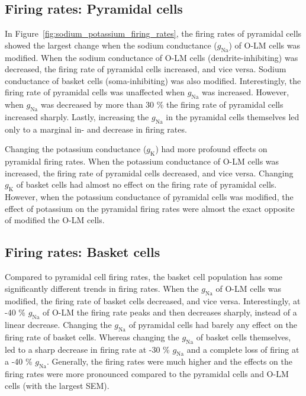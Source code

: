 \subsection{Firing rates: Pyramidal cells}
In Figure~\ref{fig:sodium_potassium_firing_rates}, the firing rates of pyramidal cells showed the largest change when the sodium conductance (\(g_{\text{Na}}\)) of O-LM cells was modified.
When the sodium conductance of O-LM cells (dendrite-inhibiting) was decreased, the firing rate of pyramidal cells increased, and vice versa.
Sodium conductance of basket cells (soma-inhibiting) was also modified. Interestingly, the firing rate of pyramidal cells was unaffected when \(g_{\text{Na}}\) was increased.
However, when \(g_{\text{Na}}\) was decreased by more than 30 \% the firing rate of pyramidal cells increased sharply.
Lastly, increasing the \(g_{\text{Na}}\) in the pyramidal cells themselves led only to a marginal in- and decrease in firing rates.

Changing the potassium conductance (\(g_{\text{K}}\)) had more profound effects on pyramidal firing rates.
When the potassium conductance of O-LM cells was increased, the firing rate of pyramidal cells decreased, and vice versa.
Changing \(g_{\text{K}}\) of basket cells had almost no effect on the firing rate of pyramidal cells.
However, when the potassium conductance of pyramidal cells was modified, the effect of potassium on the pyramidal firing rates were almost the exact opposite of modified the O-LM cells.

\subsection{Firing rates: Basket cells}
Compared to pyramidal cell firing rates, the basket cell population has some significantly different trends in firing rates.
When the \(g_{\text{Na}}\) of O-LM cells was modified, the firing rate of basket cells decreased, and vice versa.
Interestingly, at -40 \% \(g_{\text{Na}}\) of O-LM the firing rate peaks and then decreases sharply, instead of a linear decrease.
Changing the \(g_{\text{Na}}\) of pyramidal cells had barely any effect on the firing rate of basket cells.
Whereas changing the \(g_{\text{Na}}\) of basket cells themselves, led to a sharp decrease in firing rate at -30 \% \(g_{\text{Na}}\) and a complete loss of firing at a -40 \%  \(g_{\text{Na}}\).
Generally, the firing rates were much higher and the effects on the firing rates were more pronounced compared to the pyramidal cells and O-LM cells (with the largest SEM).

